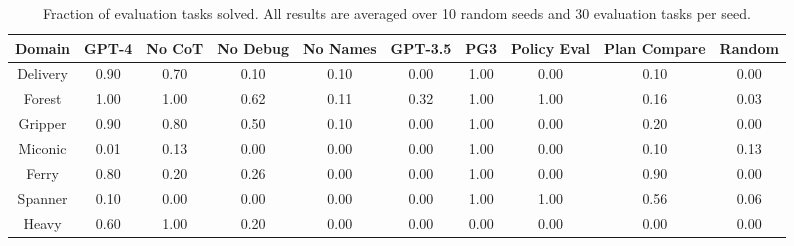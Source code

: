 \begin{table}[t]
\centering
\begin{tabular}{cccccccccc} 
 \toprule
 \textbf{Domain} & GPT-4 & No CoT & No Debug & No Names & GPT-3.5 & PG3 & Policy Eval & Plan Compare & Random \\
 \midrule
 Delivery & 0.90 & 0.70 & 0.10 & 0.10 & 0.00 & 1.00 & 0.00 & 0.10 & 0.00 \\ 
 Forest & 1.00 & 1.00 & 0.62 & 0.11 & 0.32 & 1.00 & 1.00 & 0.16 & 0.03 \\ 
 Gripper & 0.90 & 0.80 & 0.50 & 0.10 & 0.00 & 1.00 & 0.00 & 0.20 & 0.00 \\ 
 Miconic & 0.01 & 0.13 & 0.00 & 0.00 & 0.00 & 1.00 & 0.00 & 0.10 & 0.13 \\ 
 Ferry & 0.80 & 0.20 & 0.26 & 0.00 & 0.00 & 1.00 & 0.00 & 0.90 & 0.00 \\ 
 Spanner & 0.10 & 0.00 & 0.00& 0.00 & 0.00  & 1.00 & 1.00 & 0.56 & 0.06 \\ 
 Heavy & 0.60 & 1.00 & 0.20 & 0.00 & 0.00 & 0.00 & 0.00 & 0.00 & 0.00 \\ 
 \bottomrule
\end{tabular}
\caption{Fraction of evaluation tasks solved. All results are averaged over 10 random seeds and 30 evaluation tasks per seed.}
\label{table:main_results}
\end{table}

